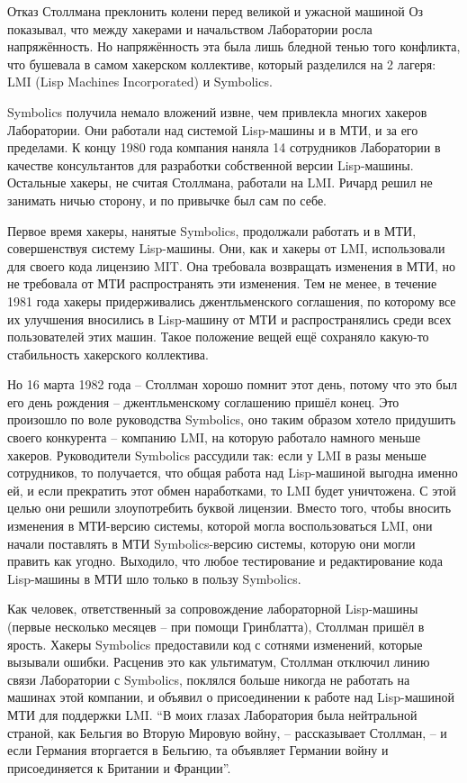 Отказ Столлмана преклонить колени перед великой и ужасной машиной Оз показывал, что между хакерами и начальством Лаборатории росла напряжённость. Но напряжённость эта была лишь бледной тенью того конфликта, что бушевала в самом хакерском коллективе, который разделился на 2 лагеря: LMI (Lisp Machines Incorporated) и Symbolics.

Symbolics получила немало вложений извне, чем привлекла многих хакеров Лаборатории. Они работали над системой Lisp-машины и в МТИ, и за его пределами. К концу 1980 года компания наняла 14 сотрудников Лаборатории в качестве консультантов для разработки собственной версии Lisp-машины. Остальные хакеры, не считая Столлмана, работали на LMI.  Ричард решил не занимать ничью сторону, и по привычке был сам по себе.

Первое время хакеры, нанятые Symbolics, продолжали работать и в МТИ, совершенствуя систему Lisp-машины. Они, как и хакеры от LMI, использовали для своего кода лицензию MIT. Она требовала возвращать изменения в МТИ, но не требовала от МТИ распространять эти изменения. Тем не менее, в течение 1981 года хакеры придерживались джентльменского соглашения, по которому все их улучшения вносились в Lisp-машину от МТИ и распространялись среди всех пользователей этих машин. Такое положение вещей ещё сохраняло какую-то стабильность хакерского коллектива.

Но 16 марта 1982 года -- Столлман хорошо помнит этот день, потому что это был его день рождения -- джентльменскому соглашению пришёл конец. Это произошло по воле руководства Symbolics, оно таким образом хотело придушить своего конкурента -- компанию LMI, на которую работало намного меньше хакеров. Руководители Symbolics рассудили так: если у LMI в разы меньше сотрудников, то получается, что общая работа над Lisp-машиной выгодна именно ей, и если прекратить этот обмен наработками, то LMI будет уничтожена. С этой целью они решили злоупотребить буквой лицензии. Вместо того, чтобы вносить изменения в МТИ-версию системы, которой могла воспользоваться LMI, они начали поставлять в МТИ Symbolics-версию системы, которую они могли править как угодно. Выходило, что любое тестирование и редактирование кода Lisp-машины в МТИ шло только в пользу Symbolics.

Как человек, ответственный за сопровождение лабораторной Lisp-машины (первые несколько месяцев -- при помощи Гринблатта), Столлман пришёл в ярость. Хакеры Symbolics предоставили код с сотнями изменений, которые вызывали ошибки. Расценив это как ультиматум, Столлман отключил линию связи Лаборатории с Symbolics, поклялся больше никогда не работать на машинах этой компании, и объявил о присоединении к работе над Lisp-машиной МТИ для поддержки LMI. \enquote{В моих глазах Лаборатория была нейтральной страной, как Бельгия во Вторую Мировую войну, -- рассказывает Столлман, -- и если Германия вторгается в Бельгию, та объявляет Германии войну и присоединяется к Британии и Франции}.

